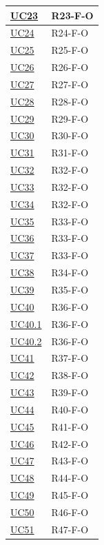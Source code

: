 \begin{longtable}{|p{2.8cm}|p{10.2cm}|}
	\hyperlink{uc23}{UC23}   & R23-F-O \\ \hline
	\hyperlink{uc24}{UC24}   & R24-F-O \\ \hline
	\hyperlink{uc25}{UC25}   & R25-F-O \\ \hline
	\hyperlink{uc26}{UC26}   & R26-F-O \\ \hline
	\hyperlink{uc27}{UC27}   & R27-F-O \\ \hline
	\hyperlink{uc28}{UC28}   & R28-F-O \\ \hline
	\hyperlink{uc29}{UC29}   & R29-F-O \\ \hline
	\hyperlink{uc30}{UC30}   & R30-F-O \\ \hline
	\hyperlink{uc31}{UC31}   & R31-F-O \\ \hline
	\hyperlink{uc32}{UC32}   & R32-F-O \\ \hline
	\hyperlink{uc33}{UC33}   & R32-F-O \\ \hline
	\hyperlink{uc34}{UC34}   & R32-F-O \\ \hline
	\hyperlink{uc35}{UC35}   & R33-F-O \\ \hline
	\hyperlink{uc36}{UC36}   & R33-F-O \\ \hline
	\hyperlink{uc37}{UC37}   & R33-F-O \\ \hline
	\hyperlink{uc38}{UC38}   & R34-F-O \\ \hline
	\hyperlink{uc39}{UC39}   & R35-F-O \\ \hline
	\hyperlink{uc40}{UC40}   & R36-F-O \\ \hline
	\hyperlink{uc40.1}{UC40.1} & R36-F-O \\ \hline
	\hyperlink{uc40.2}{UC40.2} & R36-F-O \\ \hline
	\hyperlink{uc41}{UC41}   & R37-F-O \\ \hline
	\hyperlink{uc42}{UC42}   & R38-F-O \\ \hline
	\hyperlink{uc43}{UC43}   & R39-F-O \\ \hline
	\hyperlink{uc44}{UC44}   & R40-F-O \\ \hline
	\hyperlink{uc45}{UC45}   & R41-F-O \\ \hline
	\hyperlink{uc46}{UC46}   & R42-F-O \\ \hline
	\hyperlink{uc47}{UC47}   & R43-F-O \\ \hline
	\hyperlink{uc48}{UC48}   & R44-F-O \\ \hline
	\hyperlink{uc49}{UC49}   & R45-F-O \\ \hline
	\hyperlink{uc50}{UC50}   & R46-F-O \\ \hline
	\hyperlink{uc51}{UC51}   & R47-F-O \\ \hline

\end{longtable}
